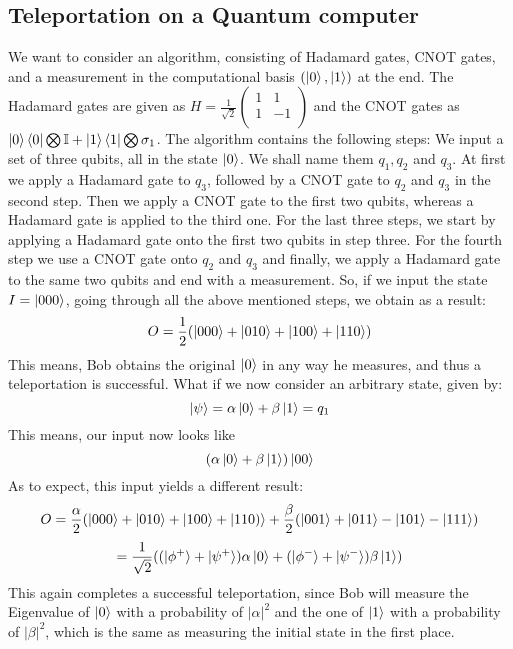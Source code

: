 \documentclass[a4paper]{article}
\begin{document}
\subsection{Teleportation on a Quantum computer}
We want to consider an algorithm, consisting of Hadamard gates, CNOT gates, and a measurement in the computational basis $(\ket{0},\ket{1})$ at the end. The Hadamard gates are given as $H=\frac{1}{\sqrt{2}}\begin{pmatrix}
    1 & 1 \\
    1 & -1 \\
\end{pmatrix}$
and the CNOT gates as $\ket{0}\bra{0}\bigotimes\mathbb{I}+\ket{1}\bra{1}\bigotimes\sigma_1$.
The algorithm contains the following steps:
We input a set of three qubits, all in the state $\ket{0}$. We shall name them $q_1,q_2$ and $q_3$. At first we apply a Hadamard gate to $q_3$, followed by a CNOT gate to $q_2$ and $q_3$ in the second step. Then we apply a CNOT gate to the first two qubits, whereas a Hadamard gate is applied to the third one. For the last three steps, we start by applying a Hadamard gate onto the first two qubits in step three. For the fourth step we use a CNOT gate onto $q_2$ and $q_3$ and finally, we apply a Hadamard gate to the same two qubits and end with a measurement. So, if we input the state $I=\ket{000}$, going through all the above mentioned steps, we obtain as a result:
\begin{equation}
    O=\frac{1}{2}(\ket{000}+\ket{010}+\ket{100}+\ket{110})
\end{equation}
This means, Bob obtains the original $\ket{0}$ in any way he measures, and thus a teleportation is successful. What if we now consider an arbitrary state, given by:
\begin{equation}
    \ket{\psi}=\alpha\ket{0}+\beta\ket{1}=q_1
\end{equation}
This means, our input now looks like
\begin{equation}
    (\alpha\ket{0}+\beta\ket{1})\ket{00}
\end{equation}
As to expect, this input yields a different result:
\begin{equation}
    O=\frac{\alpha}{2}(\ket{000}+\ket{010}+\ket{100}+\ket{110)}+\frac{\beta}{2}(\ket{001}+\ket{011}-\ket{101}-\ket{111})
\end{equation}
\begin{equation}
    =\frac{1}{\sqrt{2}}((\ket{\phi^+}+\ket{\psi^+})\alpha\ket{0}+(\ket{\phi^-}+\ket{\psi^-})\beta\ket{1})
\end{equation}
This again completes a successful teleportation, since Bob will measure the Eigenvalue of $\ket{0}$ with a probability of $|\alpha|^2$ and the one of $\ket{1}$ with a probability of $|\beta|^2$, which is the same as measuring the initial state in the first place.
\end{document}
